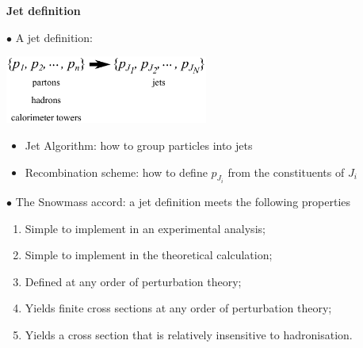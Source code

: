 \documentclass[9pt,a4paper,unknownkeysallowed,xcolor=dvipsnames,aspectratio=43]{beamer}
\begin{document}
\begin{frame}{\bf\huge Jet definition}

{\color{darkred}\Large$\bullet$} A jet definition:
\begin{center}
\includegraphics[width=0.5\textwidth]{03/jetdef.pdf}
\end{center}
\begin{itemize}
    \item[\diamondsuit] {\color{darkred} Jet Algorithm:} how to group particles into jets
    \vspace{1mm}
    \item[\diamondsuit] {\color{darkred} Recombination scheme:} how to define $p_{J_i}$ from the constituents of $J_i$
\end{itemize}
\vspace{2mm}

{\color{darkred}\Large$\bullet$} {\color{darkred}The Snowmass accord:} a jet definition meets the following properties
\vspace{2mm}
\begin{enumerate}
  \itemsep-0.1cm
\item Simple to implement in an experimental analysis;\vspace{2mm}
\item Simple to implement in the theoretical calculation;\vspace{2mm}
\item Defined at any order of perturbation theory;\vspace{2mm}
\item Yields finite cross sections at any order of perturbation theory;\vspace{2mm}
\item Yields a cross section that is relatively insensitive to hadronisation.
\end{enumerate}
\end{frame}
\end{document}
